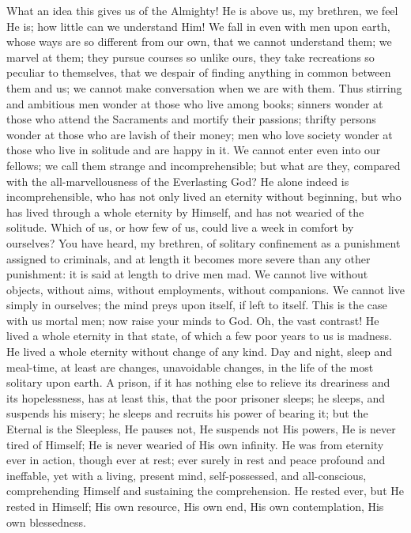 What an idea this gives us of the Almighty! He is above us, my
brethren, we feel He is; how little can we understand Him! We fall in
even with men upon earth, whose ways are so different from our own,
that we cannot understand them; we marvel at them; they pursue courses
so unlike ours, they take recreations so peculiar to themselves, that
we despair of finding anything in common between them and us; we
cannot make conversation when we are with them. Thus stirring and
ambitious men wonder at those who live among books; sinners wonder at
those who attend the Sacraments and mortify their passions; thrifty
persons wonder at those who are lavish of their money; men who love
society wonder at those who live in solitude and are happy in it. We
cannot enter even into our fellows; we call them strange and
incomprehensible; but what are they, compared with the all-marvellousness
of the Everlasting God? He alone indeed is incomprehensible, who has
not only lived an eternity without beginning, but who has lived
through a whole eternity by Himself, and has not wearied of the
solitude. Which of us, or how few of us, could live a week in comfort
by ourselves? You have heard, my brethren, of solitary confinement as
a punishment assigned to criminals, and at length it becomes more
severe than any other punishment: it is said at length to drive men
mad. We cannot live without objects, without aims, without
employments, without companions. We cannot live simply in ourselves;
the mind preys upon itself, if left to itself. This is the case with
us mortal men; now raise your minds to God. Oh, the vast contrast! He
lived a whole eternity in that state, of which a few poor years to us
is madness. He lived a whole eternity without change of any kind. Day
and night, sleep and meal-time, at least are changes, unavoidable
changes, in the life of the most solitary upon earth. A prison, if it
has nothing else to relieve its dreariness and its hopelessness, has
at least this, that the poor prisoner sleeps; he sleeps, and suspends
his misery; he sleeps and recruits his power of bearing it; but the
Eternal is the Sleepless, He pauses not, He suspends not His powers,
He is never tired of Himself; He is never wearied of His own infinity.
He was from eternity ever in action, though ever at rest; ever surely
in rest and peace profound and ineffable, yet with a living, present
mind, self-possessed, and all-conscious, comprehending Himself and
sustaining the comprehension. He rested ever, but He rested in
Himself; His own resource, His own end, His own contemplation, His own
blessedness.

